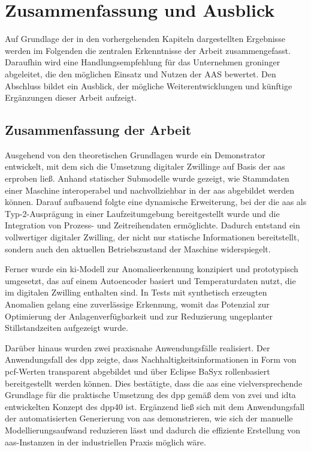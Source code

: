 \newpage
\section{Zusammenfassung und Ausblick}
\label{sec:Zusammenfassung}

Auf Grundlage der in den vorhergehenden Kapiteln dargestellten Ergebnisse werden im Folgenden die zentralen Erkenntnisse der Arbeit zusammengefasst. 
Daraufhin wird eine Handlungsempfehlung für das Unternehmen groninger abgeleitet, die den möglichen Einsatz und Nutzen der AAS bewertet. 
Den Abschluss bildet ein Ausblick, der mögliche Weiterentwicklungen und künftige Ergänzungen dieser Arbeit aufzeigt.

\subsection{Zusammenfassung der Arbeit}

Ausgehend von den theoretischen Grundlagen wurde ein Demonstrator entwickelt, mit dem sich die Umsetzung digitaler Zwillinge auf Basis der \acs{aas} erproben ließ.
Anhand statischer Submodelle wurde gezeigt, wie Stammdaten einer Maschine interoperabel und nachvollziehbar in der \acs{aas} abgebildet werden können.
Darauf aufbauend folgte eine dynamische Erweiterung, bei der die \acs{aas} als Typ-2-Ausprägung in einer Laufzeitumgebung bereitgestellt wurde und die Integration von Prozess- und Zeitreihendaten ermöglichte.
Dadurch entstand ein vollwertiger digitaler Zwilling, der nicht nur statische Informationen bereitstellt, sondern auch den aktuellen Betriebszustand der Maschine widerspiegelt.

Ferner wurde ein \acs{ki}-Modell zur Anomalieerkennung konzipiert und prototypisch umgesetzt, das auf einem Autoencoder basiert und Temperaturdaten nutzt, die im digitalen Zwilling enthalten sind.
In Tests mit synthetisch erzeugten Anomalien gelang eine zuverlässige Erkennung, womit das Potenzial zur Optimierung der Anlagenverfügbarkeit und zur Reduzierung ungeplanter Stillstandzeiten aufgezeigt wurde.

Darüber hinaus wurden zwei praxisnahe Anwendungsfälle realisiert.
Der Anwendungsfall des \acs{dpp} zeigte, dass Nachhaltigkeitsinformationen in Form von \acs{pcf}-Werten transparent abgebildet und über Eclipse BaSyx rollenbasiert bereitgestellt werden können.
Dies bestätigte, dass die \acs{aas} eine vielversprechende Grundlage für die praktische Umsetzung des \acs{dpp} gemäß dem von \acs{zvei} und \acs{idta} entwickelten Konzept des \acs{dpp40} ist.
Ergänzend ließ sich mit dem Anwendungsfall der automatisierten Generierung von \acs{aas} demonstrieren, wie sich der manuelle Modellierungsaufwand reduzieren lässt und dadurch die effiziente Erstellung von \acs{aas}-Instanzen in der industriellen Praxis möglich wäre.

